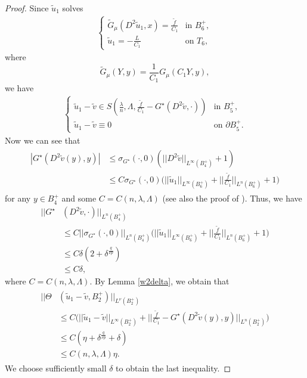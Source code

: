 \documentclass[11pt, reqno]{amsart}
\numberwithin{equation}{section}
\begin{document}
\begin{proof}
Since $\tilde{u}_{1}$ solves
\begin{align*}
\left\{ \begin{array}{ll}
\tilde{G}_{\mu}(D^{2}\tilde{u}_{1},x) = \frac{\tilde{f}}{C_{1}} & \textrm{in $B_{6}^{+}, $}\\
\tilde{u}_{1}=-\frac{L}{C_{1}}  & \textrm{on $T_{6},$}
\end{array} \right.
\end{align*}
where
$$\tilde{G}_{\mu}(Y,y)=\frac{1}{C_{1}}G_{\mu}(C_{1}Y,y), $$
we have
\begin{align*} 
\left\{ \begin{array}{ll}
\tilde{u}_{1}-\tilde{v} \in S(\frac{\lambda}{n}, \Lambda,  \frac{\tilde{f}}{C_{1}}-G^{\star}(D^{2}\tilde{v},\cdot)) & \textrm{in $B_{5}^{+}, $}\\
\tilde{u}_{1}-\tilde{v} \equiv 0& \textrm{on $\partial B_{5}^{+}  $.} 
\end{array} \right.
\end{align*}
Now we can see that
\begin{align}\label{gstarest}\begin{split}
|G^{\star}(D^{2}\tilde{v}(y),y)| &\le \sigma_{G^{\star}}(\cdot,0)  (||D^{2}\tilde{v}||_{L^{\infty}(B_{4}^{+})}+1) \\
& \le C\sigma_{G^{\star}}(\cdot,0) \bigg( ||\tilde{u}_{1}||_{L^{\infty}(B_{6}^{+})} +
\bigg|\bigg| \frac{\tilde{f}}{C_{1}}  \bigg|\bigg|_{L^{n}(B_{6}^{+})} +1 \bigg)\end{split}
\end{align}
for any $y \in B_{4}^{+}$ and some $C=C(n,\lambda,\Lambda)$
(see also the proof of \cite[Lemma 7.9]{MR1351007}).
Thus, we have
\begin{align*}
||G^{\star}&(D^{2}\tilde{v},\cdot)||_{L^{n}(B_{4}^{+})} \\ & \le
C||\sigma_{G^{\star}}(\cdot,0) ||_{L^{n}(B_{4}^{+})}\bigg( ||\tilde{u}_{1}||_{L^{\infty}(B_{6}^{+})} +
\bigg|\bigg| \frac{\tilde{f}}{C_{1}}  \bigg|\bigg|_{L^{n}(B_{6}^{+})} +1 \bigg)
\\ & \le C\delta(2 +\delta^{\frac{q}{\nu p}} )
\\ & \le C\delta,
\end{align*}
where $C= C(n,\lambda,\Lambda)$.
By Lemma \ref{w2delta}, we obtain that
\begin{align} \begin{split} \label{difldelest}
||\Theta& (\tilde{u}_{1}-\tilde{v}, B_{2}^{+})||_{L^{\nu}(B_{2}^{+})} \\& \le
C\bigg(||\tilde{u}_{1}-\tilde{v}||_{L^{\infty}(B_{2}^{+})}+
\bigg|\bigg|\frac{\tilde{f}}{C_{1}}-G^{\star}(D^{2}\tilde{v}(y),y)\bigg|\bigg|_{L^{n}(B_{2}^{+})}\bigg)\\ &
\le C(\eta + \delta^{\frac{q}{\nu p}} + \delta)
\\ & \le C(n,\lambda,\Lambda)\eta.\end{split}
\end{align}
We choose sufficiently small $\delta$ to obtain the last inequality. 



\end{proof}
\end{document}
